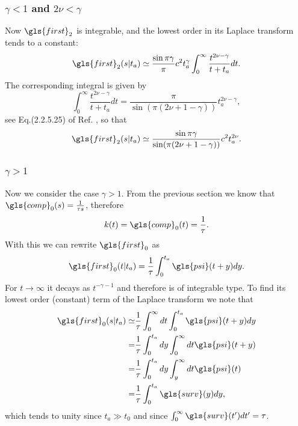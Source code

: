 \subsubsection{$\gamma <1$  and $2\nu < \gamma $} 
Now $\gls{first}_2$ is integrable, and the lowest order in its Laplace transform tends to a constant:
\begin{equation}
 \gls{first}_2(s|t_a) \simeq \frac{\sin \pi \gamma}{\pi}  c^2 t_a^\gamma \int_0^\infty \frac{ t^{2\nu-\gamma}}{t+t_a} dt.
\end{equation}
The corresponding integral is given by
\begin{equation}
 \int_0^\infty \frac{t^{2\nu-\gamma}}{t+t_a} dt = \frac{\pi }{\sin (\pi(2\nu +1- \gamma))}t_a^{2\nu - \gamma} ,
\end{equation}
see Eq.(2.2.5.25) of Ref. \cite{BryPr}, so that
\begin{equation}
 \gls{first}_2(s|t_a) \simeq   \frac{\sin \pi \gamma}{\sin (\pi(2\nu +1- \gamma))}c^2 t_a^{2\nu}.
\end{equation}

\subsubsection{$\gamma > 1$}
Now we consider the case $\gamma > 1$. From the previous section we know that $\gls{comp}_0(s)=\frac{1}{\tau s}$, therefore
\begin{equation}
k(t) =\gls{comp}_0(t)= \frac{1}{\tau} . \label{eqn:kGammaLarge}
\end{equation}
With this we can rewrite $\gls{first}_0$ as 
\begin{equation}
 \gls{first}_0(t|t_a) = \frac{1}{\tau} \int_0^{t_a} \gls{psi}(t+y)dy.
\end{equation}
For $t \to \infty$ it decays as $t^{-\gamma-1}$ and therefore is of integrable type. To find its lowest order (constant) term of the Laplace transform we note that
\begin{align}
 \gls{first}_0(s|t_a) \simeq & \frac{1}{\tau} \int_0^\infty dt \int_0^{t_a} \gls{psi}(t+y)dy \\
 =& \frac{1}{\tau} \int_0^{t_a} dy \int_0^\infty dt \gls{psi}(t+y)  \\
 =& \frac{1}{\tau} \int_0^{t_a} dy \int_y^\infty dt \gls{psi}(t) \\
 =& \frac{1}{\tau} \int^{t_a}_0 \gls{surv}(y) dy,
\end{align}
which tends to unity since $t_a \gg t_0$ and since $\int_0^\infty \gls{surv}(t') dt' = \tau$. 

